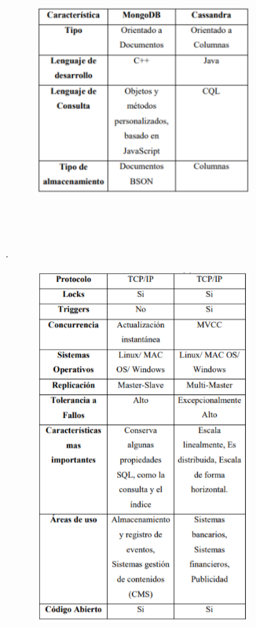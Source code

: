 \documentclass[12pt]{article}
\begin{document}
\begin{multicols}{2}
\vspace{\baselineskip}



\begin{figure}[H]
	\begin{Center}
		\includegraphics[width=2.82in,height=3.46in]{./media/image11.png}
	\end{Center}
\end{figure}



{\fontsize{9pt}{10.8pt}\selectfont .\par}\par




\begin{figure}[H]
	\begin{Center}
		\includegraphics[width=2.81in,height=4.63in]{./media/image12.png}
	\end{Center}
\end{figure}



\end{multicols}
\end{document}
